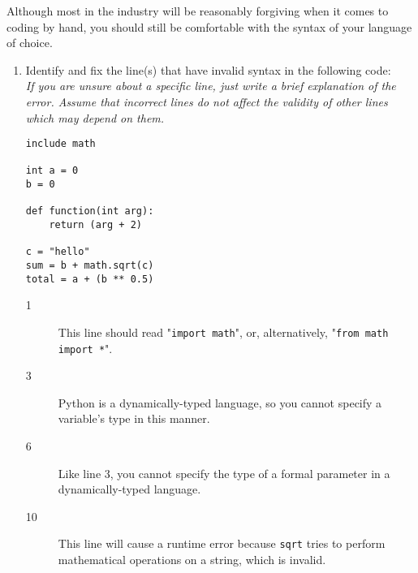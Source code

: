 Although most in the industry will be reasonably forgiving when it comes to coding by hand,
you should still be comfortable with the syntax of your language of choice.

\begin{enumerate}
\item Identify and fix the line(s) that have invalid syntax in the following code:\\
\emph{If you are unsure about a specific line, just write a brief explanation of the error. Assume that incorrect lines do not affect the validity of other lines which may depend on them.}
\begin{lstlisting}
include math

int a = 0
b = 0

def function(int arg):
	return (arg + 2)

c = "hello"
sum = b + math.sqrt(c)
total = a + (b ** 0.5)
\end{lstlisting}

\begin{answer}
\begin{description}

	\item[1] This line should read "\texttt{import math}", or, alternatively, "\texttt{from math import *}".
	\item[3] Python is a dynamically-typed language, so you cannot specify a variable's type in this manner.
	\item[6] Like line 3, you cannot specify the type of a formal parameter in a dynamically-typed language.
	\item[10] This line will cause a runtime error because \texttt{sqrt} tries to perform mathematical operations on a string, which is invalid.

\end{description}
\end{answer}


\end{enumerate}
